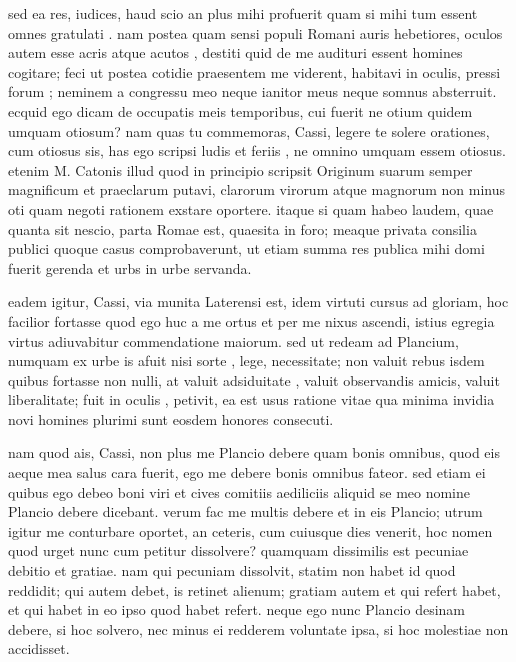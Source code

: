  sed ea res, iudices, haud scio an plus mihi profuerit quam si mihi tum essent omnes gratulati . nam postea quam sensi populi Romani auris hebetiores, oculos autem esse acris atque acutos , destiti quid de me audituri essent homines cogitare; feci ut postea cotidie praesentem me viderent, habitavi in oculis, pressi forum ; neminem a congressu meo neque ianitor meus neque somnus absterruit. ecquid ego dicam de occupatis meis temporibus, cui fuerit ne otium quidem umquam otiosum? nam quas tu commemoras, Cassi, legere te solere orationes, cum otiosus sis, has ego scripsi ludis et feriis , ne omnino umquam essem otiosus. etenim M. Catonis illud quod in principio scripsit Originum suarum semper magnificum et praeclarum putavi, clarorum virorum atque magnorum non minus oti quam negoti rationem exstare oportere. itaque si quam habeo laudem, quae quanta sit nescio, parta Romae est, quaesita in foro; meaque privata consilia publici quoque casus comprobaverunt, ut etiam summa res publica mihi domi fuerit gerenda et urbs in urbe servanda.

 eadem igitur, Cassi, via munita Laterensi est, idem virtuti cursus ad gloriam, hoc facilior fortasse quod ego huc a me ortus et per me nixus ascendi, istius egregia virtus adiuvabitur commendatione maiorum. sed ut redeam ad Plancium, numquam ex urbe is afuit nisi sorte , lege, necessitate; non valuit rebus isdem quibus fortasse non nulli, at valuit adsiduitate , valuit observandis amicis, valuit liberalitate; fuit in oculis , petivit, ea est usus ratione vitae qua minima invidia novi homines plurimi sunt eosdem honores consecuti.

 nam quod ais, Cassi, non plus me Plancio debere quam bonis omnibus, quod eis aeque mea salus cara fuerit, ego me debere bonis omnibus fateor. sed etiam ei quibus ego debeo boni viri et cives comitiis aediliciis aliquid se meo nomine Plancio debere dicebant. verum fac me multis debere et in eis Plancio; utrum igitur me conturbare oportet, an ceteris, cum cuiusque dies venerit, hoc nomen quod urget nunc cum petitur dissolvere? quamquam dissimilis est pecuniae debitio et gratiae. nam qui pecuniam dissolvit, statim non habet id quod reddidit; qui autem debet, is retinet alienum; gratiam autem et qui refert habet, et qui habet in eo ipso quod habet refert. neque ego nunc Plancio desinam debere, si hoc solvero, nec minus ei redderem voluntate ipsa, si hoc molestiae non accidisset.


